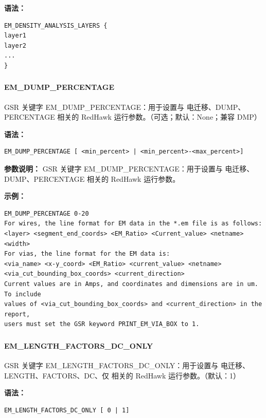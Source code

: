 \textbf{语法：}
\begin{lstlisting}
EM_DENSITY_ANALYSIS_LAYERS {
layer1
layer2
...
}
\end{lstlisting}

\subsubsection{}
\paragraph*{EM_DUMP_PERCENTAGE}

GSR 关键字 EM_DUMP_PERCENTAGE：用于设置与 电迁移、DUMP、PERCENTAGE 相关的 RedHawk 运行参数。（可选；默认：None；兼容 DMP）

\textbf{语法：}
\begin{lstlisting}
EM_DUMP_PERCENTAGE [ <min_percent> | <min_percent>-<max_percent>]
\end{lstlisting}

\textbf{参数说明：}
GSR 关键字 EM\_DUMP\_PERCENTAGE：用于设置与 电迁移、DUMP、PERCENTAGE 相关的 RedHawk 运行参数。

\textbf{示例：}
\begin{lstlisting}
EM_DUMP_PERCENTAGE 0-20
For wires, the line format for EM data in the *.em file is as follows:
<layer> <segment_end_coords> <EM_Ratio> <Current_value> <netname> <width>
For vias, the line format for the EM data is:
<via_name> <x-y_coord> <EM_Ratio> <current_value> <netname>
<via_cut_bounding_box_coords> <current_direction>
Current values are in Amps, and coordinates and dimensions are in um. To include
values of <via_cut_bounding_box_coords> and <current_direction> in the report,
users must set the GSR keyword PRINT_EM_VIA_BOX to 1.
\end{lstlisting}

\subsubsection{}
\paragraph*{EM_LENGTH_FACTORS_DC_ONLY}

GSR 关键字 EM_LENGTH_FACTORS_DC_ONLY：用于设置与 电迁移、LENGTH、FACTORS、DC、仅 相关的 RedHawk 运行参数。（默认：1）

\textbf{语法：}
\begin{lstlisting}
EM_LENGTH_FACTORS_DC_ONLY [ 0 | 1]
\end{lstlisting}


